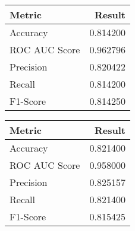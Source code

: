 \begin{tabular}{lr}
\toprule
       Metric &   Result \\
\midrule
     Accuracy & 0.814200 \\
ROC AUC Score & 0.962796 \\
    Precision & 0.820422 \\
       Recall & 0.814200 \\
     F1-Score & 0.814250 \\
\bottomrule
\end{tabular}
\begin{tabular}{lr}
\toprule
       Metric &   Result \\
\midrule
     Accuracy & 0.821400 \\
ROC AUC Score & 0.958000 \\
    Precision & 0.825157 \\
       Recall & 0.821400 \\
     F1-Score & 0.815425 \\
\bottomrule
\end{tabular}
